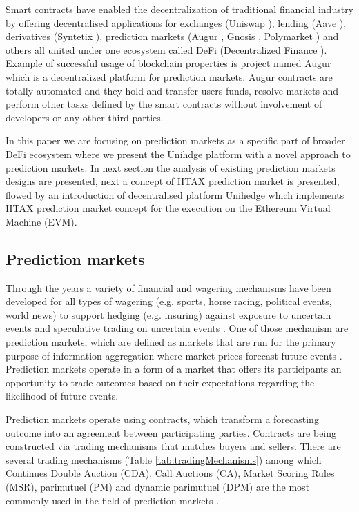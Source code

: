 \documentclass{article}
\begin{document}
	Smart contracts have enabled the decentralization of traditional financial industry by offering decentralised applications for exchanges (Uniswap \cite{Uniswap}), lending (Aave \cite{Aave}), derivatives (Syntetix \cite{Synthetix}), prediction markets (Augur \cite{Augur}, Gnosis \cite{Gnosis}, Polymarket \cite{Polymarket}) and others all united under one ecosystem called DeFi (Decentralized Finance \cite{Chen2019DecentralizedFB}). Example of successful usage of blockchain properties is project named Augur which is a decentralized platform for prediction markets. Augur contracts are totally automated and they hold and transfer users funds, resolve markets and perform other tasks defined by the smart contracts without involvement of developers or any other third parties. 
	
	In this paper we are focusing on prediction markets as a specific part of broader DeFi ecosystem where we present the Unihdge platform with a novel approach to prediction markets. In next section the analysis of existing prediction markets designs are presented, next a concept of HTAX prediction market is presented, flowed by an introduction of decentralised platform Unihedge which implements HTAX prediction market concept for the execution on the Ethereum Virtual Machine (EVM).
	
	\subsection{Prediction markets}
	
	Through the years a variety of financial and wagering mechanisms have been developed for all types of wagering (e.g. sports, horse racing, political events, world news) to support hedging (e.g. insuring) against exposure to uncertain events and speculative trading on uncertain events \cite{Pennock}.  One of those mechanism are prediction markets, which are defined as markets that are run for the primary purpose of information aggregation where market prices forecast future events \cite{Berg}. Prediction markets operate in a form of a market that offers its participants an opportunity to trade outcomes based on their expectations regarding the likelihood of future events. 
	
	Prediction markets operate using contracts, which transform a forecasting outcome into an agreement between participating parties. Contracts are being constructed via trading mechanisms that matches buyers and sellers. There are several trading mechanisms (Table \ref{tab:tradingMechanisms}) among which Continues Double Auction (CDA), Call Auctions (CA), Market Scoring Rules (MSR), parimutuel (PM) and dynamic parimutuel (DPM) are the most commonly used in the field of prediction markets \cite{Luckner}.
	
\end{document}
